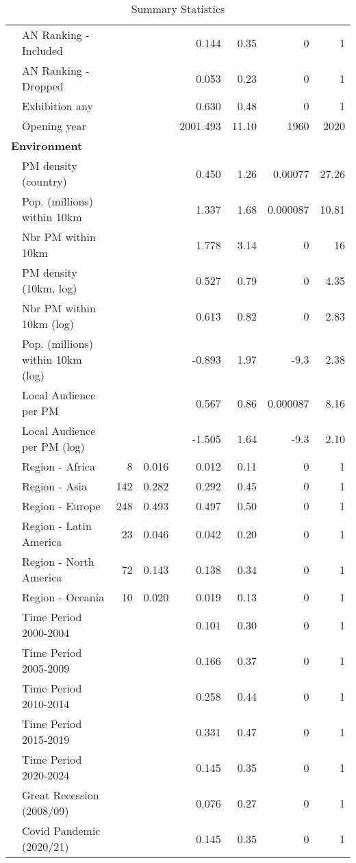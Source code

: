 \documentclass[12pt]{article}
\begin{document}
\begin{table}[ht]
\begin{tabular}{llrrrrrr}
   & AN Ranking - Included &  &  &    0.144 &  0.35 & 0 & 1 \\ 
   & AN Ranking - Dropped &  &  &    0.053 &  0.23 & 0 & 1 \\ 
   & Exhibition any &  &  &    0.630 &  0.48 & 0 & 1 \\ 
   & Opening year &  &  & 2001.493 & 11.10 & 1960 & 2020 \\ 
   \multicolumn{8}{l}{\textbf{Environment}} \\ 
 & PM density (country) &  &  &    0.450 &  1.26 & 0.00077 & 27.26 \\ 
   & Pop. (millions) within 10km &  &  &    1.337 &  1.68 & 0.000087 & 10.81 \\ 
   & Nbr PM within 10km &  &  &    1.778 &  3.14 & 0 & 16 \\ 
   & PM density (10km, log) &  &  &    0.527 &  0.79 & 0 & 4.35 \\ 
   & Nbr PM within 10km (log) &  &  &    0.613 &  0.82 & 0 & 2.83 \\ 
   & Pop. (millions) within 10km (log) &  &  &   -0.893 &  1.97 & -9.3 & 2.38 \\ 
   & Local Audience per PM &  &  &    0.567 &  0.86 & 0.000087 & 8.16 \\ 
   & Local Audience per PM (log) &  &  &   -1.505 &  1.64 & -9.3 & 2.10 \\ 
   & Region - Africa & 8 & 0.016 &    0.012 &  0.11 & 0 & 1 \\ 
   & Region - Asia & 142 & 0.282 &    0.292 &  0.45 & 0 & 1 \\ 
   & Region - Europe & 248 & 0.493 &    0.497 &  0.50 & 0 & 1 \\ 
   & Region - Latin America & 23 & 0.046 &    0.042 &  0.20 & 0 & 1 \\ 
   & Region - North America & 72 & 0.143 &    0.138 &  0.34 & 0 & 1 \\ 
   & Region - Oceania & 10 & 0.020 &    0.019 &  0.13 & 0 & 1 \\ 
   & Time Period 2000-2004 &  &  &    0.101 &  0.30 & 0 & 1 \\ 
   & Time Period 2005-2009 &  &  &    0.166 &  0.37 & 0 & 1 \\ 
   & Time Period 2010-2014 &  &  &    0.258 &  0.44 & 0 & 1 \\ 
   & Time Period 2015-2019 &  &  &    0.331 &  0.47 & 0 & 1 \\ 
   & Time Period 2020-2024 &  &  &    0.145 &  0.35 & 0 & 1 \\ 
   & Great Recession (2008/09) &  &  &    0.076 &  0.27 & 0 & 1 \\ 
   & Covid Pandemic (2020/21) &  &  &    0.145 &  0.35 & 0 & 1 \\ 
   \hline
\end{tabular}
\caption{Summary Statistics} 
\label{tbl:t_sumstats}
\end{table}
\end{document}
